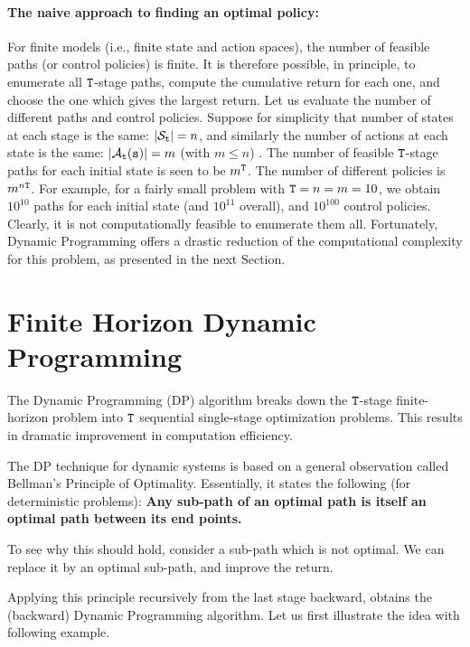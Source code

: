 \paragraph{The naive approach to finding an optimal policy:}
For finite models (i.e., finite state and action spaces), the number
of feasible paths (or control policies) is finite.  It is therefore
possible, in principle, to enumerate all ${\tt T}$-stage paths,
compute the cumulative return for each one, and choose the one which
gives the largest return. Let us evaluate the number of different
paths and control policies. Suppose for simplicity that number of
states at each stage is the same: $|{\mathcal{S}_{{\tt t}}}| = n$, and
similarly the number of actions at each state is the same:
$|{\mathcal{A}_{{\tt t}}}({\tt s})| = m$ (with $m \le n$) . The number of
feasible ${\tt T}$-stage paths for each initial state is seen to
be ${m^{\tt T}}$. The number of different policies is
${m^{n{\tt T}}}$. For example, for a fairly small problem with
${\tt T} = n = m = 10$, we obtain ${10^{10}}$ paths for each
initial state (and ${10^{11}}$ overall), and ${10^{100}}$ control
policies. Clearly, it is not computationally feasible to enumerate
them all.
%
Fortunately, Dynamic Programming offers a drastic reduction of the
computational complexity for this problem, as presented in the next Section.

\section{Finite Horizon Dynamic Programming}

The Dynamic Programming (DP) algorithm breaks down the
${\tt T}$-stage finite-horizon problem into ${\tt T}$ sequential
single-stage optimization problems. This results in dramatic
improvement in computation efficiency.

The DP technique for dynamic systems is based on a general
observation called Bellman's Principle of Optimality. Essentially, it
states the following (for deterministic problems):
\textbf{Any sub-path of an optimal path is itself an optimal path between its end points.}

To see why this should hold, consider a sub-path which is not
optimal. We can replace it by an optimal sub-path, and improve the
return.

Applying this principle recursively from the last stage backward,
obtains the (backward) Dynamic Programming algorithm. Let us first
illustrate the idea with following example.

